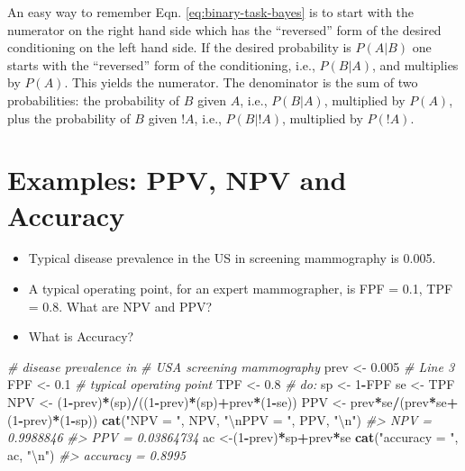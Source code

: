 \documentclass[
]{book}
\newenvironment{Shaded}{\begin{snugshade}}{\end{snugshade}}
\newcommand{\CharTok}[1]{\textcolor[rgb]{0.31,0.60,0.02}{#1}}
\newcommand{\CommentTok}[1]{\textcolor[rgb]{0.56,0.35,0.01}{\textit{#1}}}
\newcommand{\DecValTok}[1]{\textcolor[rgb]{0.00,0.00,0.81}{#1}}
\newcommand{\FloatTok}[1]{\textcolor[rgb]{0.00,0.00,0.81}{#1}}
\newcommand{\KeywordTok}[1]{\textcolor[rgb]{0.13,0.29,0.53}{\textbf{#1}}}
\newcommand{\NormalTok}[1]{#1}
\newcommand{\OperatorTok}[1]{\textcolor[rgb]{0.81,0.36,0.00}{\textbf{#1}}}
\newcommand{\StringTok}[1]{\textcolor[rgb]{0.31,0.60,0.02}{#1}}
\begin{document}
An easy way to remember Eqn. \eqref{eq:binary-task-bayes} is to start with the numerator on the right hand side which has the ``reversed'' form of the desired conditioning on the left hand side. If the desired probability is \(P(A|B)\) one starts with the ``reversed'' form of the conditioning, i.e., \(P(B|A)\), and multiplies by \(P(A)\). This yields the numerator. The denominator is the sum of two probabilities: the probability of \(B\) given \(A\), i.e., \(P(B|A)\), multiplied by \(P(A)\), plus the probability of \(B\) given \(!A\), i.e., \(P(B|!A)\), multiplied by \(P(!A)\).

\hypertarget{binary-taskNpvPpvCode}{%
\section{Examples: PPV, NPV and Accuracy}\label{binary-taskNpvPpvCode}}

\begin{itemize}
\item
  Typical disease prevalence in the US in screening mammography is 0.005.
\item
  A typical operating point, for an expert mammographer, is FPF = 0.1, TPF = 0.8. What are \(\text{NPV}\) and \(\text{PPV}\)?
\item
  What is Accuracy?
\end{itemize}

\begin{Shaded}
\begin{Highlighting}[numbers=left,,]
\CommentTok{# disease prevalence in }
\CommentTok{# USA screening mammography }
\NormalTok{prev <-}\StringTok{ }\FloatTok{0.005} \CommentTok{# Line 3 }
\NormalTok{FPF <-}\StringTok{ }\FloatTok{0.1} \CommentTok{# typical operating point }
\NormalTok{TPF <-}\StringTok{ }\FloatTok{0.8} \CommentTok{#        do: }
\NormalTok{sp <-}\StringTok{ }\DecValTok{1}\OperatorTok{-}\NormalTok{FPF }
\NormalTok{se <-}\StringTok{ }\NormalTok{TPF }
\NormalTok{NPV <-}\StringTok{ }\NormalTok{(}\DecValTok{1}\OperatorTok{-}\NormalTok{prev)}\OperatorTok{*}\NormalTok{(sp)}\OperatorTok{/}\NormalTok{((}\DecValTok{1}\OperatorTok{-}\NormalTok{prev)}\OperatorTok{*}\NormalTok{(sp)}\OperatorTok{+}\NormalTok{prev}\OperatorTok{*}\NormalTok{(}\DecValTok{1}\OperatorTok{-}\NormalTok{se)) }
\NormalTok{PPV <-}\StringTok{ }\NormalTok{prev}\OperatorTok{*}\NormalTok{se}\OperatorTok{/}\NormalTok{(prev}\OperatorTok{*}\NormalTok{se}\OperatorTok{+}\NormalTok{(}\DecValTok{1}\OperatorTok{-}\NormalTok{prev)}\OperatorTok{*}\NormalTok{(}\DecValTok{1}\OperatorTok{-}\NormalTok{sp)) }
\KeywordTok{cat}\NormalTok{(}\StringTok{"NPV = "}\NormalTok{, NPV, }\StringTok{"}\CharTok{\textbackslash{}n}\StringTok{PPV = "}\NormalTok{, PPV, }\StringTok{"}\CharTok{\textbackslash{}n}\StringTok{"}\NormalTok{)}
\CommentTok{#> NPV =  0.9988846 }
\CommentTok{#> PPV =  0.03864734}
\NormalTok{ac <-(}\DecValTok{1}\OperatorTok{-}\NormalTok{prev)}\OperatorTok{*}\NormalTok{sp}\OperatorTok{+}\NormalTok{prev}\OperatorTok{*}\NormalTok{se }
\KeywordTok{cat}\NormalTok{(}\StringTok{"accuracy = "}\NormalTok{, ac, }\StringTok{"}\CharTok{\textbackslash{}n}\StringTok{"}\NormalTok{)}
\CommentTok{#> accuracy =  0.8995}
\end{Highlighting}
\end{Shaded}
\end{document}
